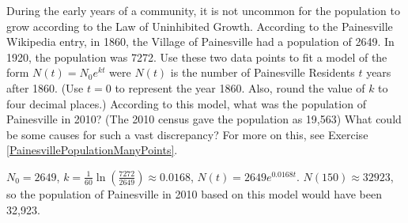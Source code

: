 \documentclass{ximera}
\begin{document}
\begin{problem}\label{PainesvillePopulationTwoPoint}
 During the early years of a community, it is not uncommon for the population to grow according to the Law of Uninhibited Growth.  According to the Painesville Wikipedia entry, in 1860, the Village of Painesville had a population of 2649.  In 1920, the population was 7272.  Use these two data points to fit a model of the form $N(t) = N_{0} e^{kt}$ were $N(t)$ is the number of Painesville Residents $t$ years after 1860.  (Use $t = 0$ to represent the year 1860.  Also, round the value of $k$ to four decimal places.)  According to this model, what was the population of Painesville in 2010?  (The 2010 census gave the population as 19,563) What could be some causes for such a vast discrepancy?  For more on this, see Exercise \ref{PainesvillePopulationManyPoints}.

\begin{solution}
     $N_{0} = 2649$,  $k = \frac{1}{60} \ln\left( \frac{7272}{2649}\right) \approx 0.0168$, $N(t) = 2649e^{0.0168t}$.  $N(150) \approx 32923$, so the population of Painesville in 2010 based on this model would have been 32,923.
\end{solution}
 
\end{problem}
\end{document}
